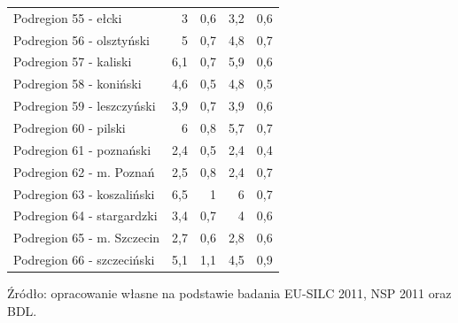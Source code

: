 \begin{center}
\begin{longtable}{p{6cm}rrrr}
Podregion 55 - ełcki                     & 3       & 0,6         & 3,2      & 0,6          \\
Podregion 56 - olsztyński                & 5       & 0,7         & 4,8      & 0,7          \\
Podregion 57 - kaliski                   & 6,1     & 0,7         & 5,9      & 0,6          \\
Podregion 58 - koniński                  & 4,6     & 0,5         & 4,8      & 0,5          \\
Podregion 59 - leszczyński               & 3,9     & 0,7         & 3,9      & 0,6          \\
Podregion 60 - pilski                    & 6       & 0,8         & 5,7      & 0,7          \\
Podregion 61 - poznański                 & 2,4     & 0,5         & 2,4      & 0,4          \\
Podregion 62 - m. Poznań                 & 2,5     & 0,8         & 2,4      & 0,7          \\
Podregion 63 - koszaliński               & 6,5     & 1           & 6        & 0,7          \\
Podregion 64 - stargardzki               & 3,4     & 0,7         & 4        & 0,6          \\
Podregion 65 - m. Szczecin               & 2,7     & 0,6         & 2,8      & 0,6          \\
Podregion 66 - szczeciński               & 5,1     & 1,1         & 4,5      & 0,9          \\
\hline
\end{longtable}
\small{Źródło: opracowanie własne na podstawie badania EU-SILC 2011, NSP 2011 oraz BDL.}
\end{center}


